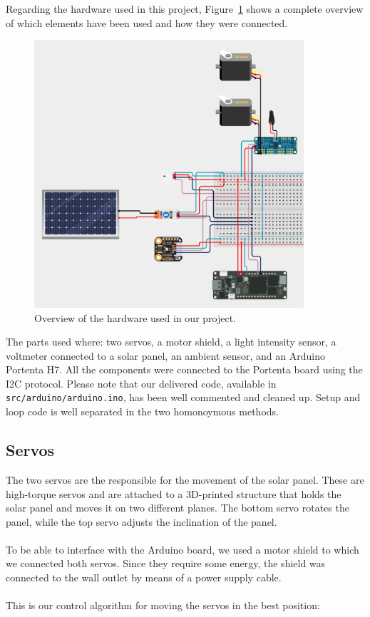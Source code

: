Regarding the hardware used in this project, Figure~\ref{fig:circuit} shows a complete overview of which elements have been used and how they were connected.
\begin{figure}[h]
    \centering
    \includegraphics[width=10cm]{../assets/png/project-circuit}
    \caption{Overview of the hardware used in our project.}
    \label{fig:circuit}
\end{figure}
The parts used where: two servos, a motor shield, a light intensity sensor, a
voltmeter connected to a solar panel, an ambient sensor, and an Arduino Portenta
H7. All the components were connected to the Portenta board using the I2C
protocol. Please note that our delivered code, available in
\texttt{src/arduino/arduino.ino}, has been well commented and cleaned up. Setup
and loop code is well separated in the two homonoymous methods.

\subsection*{Servos}
The two servos are the responsible for the movement of the solar panel. These
are high-torque servos and are attached to a 3D-printed structure that holds the
solar panel and moves it on two different planes. The bottom servo rotates the
panel, while the top servo adjusts the inclination of the panel. \\ \\
To be able to interface with the Arduino board, we used a motor shield to which we connected both servos.
Since they require some energy, the shield was connected to the wall outlet by means of a power supply cable. \\ \\
This is our control algorithm for moving the servos in the best position:

